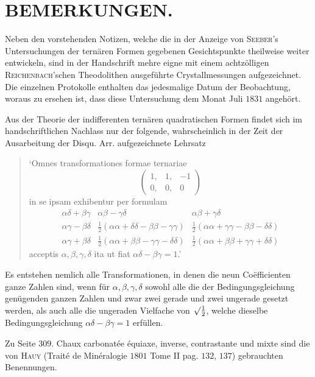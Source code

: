 %
\section*{BEMERKUNGEN.}
Neben den vorstehenden Notizen, welche die in der Anzeige von \textsc{Seeber}'s Untersuchungen der ternären Formen gegebenen Gesichtspunkte theilweise weiter entwickeln, sind in der Handschrift mehre eigne mit einem achtzölligen \textsc{Reichenbach}'schen Theodolithen ausgeführte Crystallmessungen aufgezeichnet. Die einzelnen Protokolle enthalten das jedesmalige Datum der Beobachtung, woraus zu ersehen ist, dass diese Untersuchung dem Monat Juli $1831$ angehört.

Aus der Theorie der indifferenten ternären quadratischen Formen findet sich im handschriftlichen Nachlass nur der folgende, wahrscheinlich in der Zeit der Ausarbeitung der Disqu. Arr. aufgezeichnete Lehrsatz
\begin{quote}
‘Omnes transformationes formae ternariae
\[
\left(\begin{smallmatrix}1,&1,&-1\\0,&0,&0\end{smallmatrix}\right)
\]
in se ipsam exhibentur per formulam
\[
\begin{array}{ccc}
\alpha\delta+\beta\gamma&\alpha\beta-\gamma\delta&\alpha\beta+\gamma\delta\\[.5ex]
\alpha\gamma-\beta\delta&\frac12(\alpha\alpha+\delta\delta-\beta\beta-\gamma\gamma)&\frac12(\alpha\alpha+\gamma\gamma-\beta\beta-\delta\delta)\\[.5ex]
\alpha\gamma+\beta\delta&\frac12(\alpha\alpha+\beta\beta-\gamma\gamma-\delta\delta)&\frac12(\alpha\alpha+\beta\beta+\gamma\gamma+\delta\delta)
\end{array}
\]
acceptis $\alpha,\beta,\gamma,\delta$ ita ut fiat $\alpha\delta-\beta\gamma=1$.’
\end{quote}

Es entstehen nemlich alle Transformationen, in denen die neun Coëfficienten ganze Zahlen sind, wenn für $\alpha,\beta,\gamma,\delta$ sowohl alle die der Bedingungsgleichung genügenden ganzen Zahlen und zwar zwei gerade und zwei ungerade gesetzt werden, als auch alle die ungeraden Vielfache von $\surd\frac12$, welche dieselbe Bedingungsgleichung $\alpha\delta-\beta\gamma=1$ erfüllen.

%
Zu Seite $309$. Chaux carbonatée équiaxe, inverse, contrastante und mixte sind die von \textsc{Hauy} (Traité de Minéralogie $1801$ Tome II pag. $132$, $137$) gebrauchten Benennungen.

